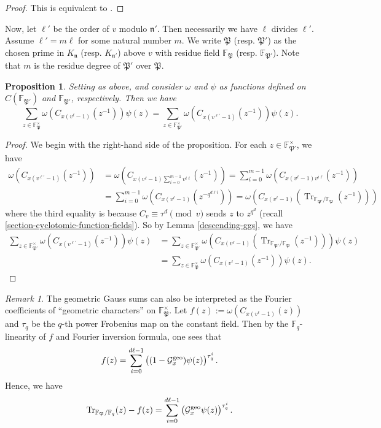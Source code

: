 \documentclass[11pt]{amsart}
\theoremstyle{plain}
\newtheorem{prop}[thm]{Proposition}
\theoremstyle{definition}
\theoremstyle{remark}
\newtheorem{rem}[thm]{Remark}
\numberwithin{equation}{section}
\newcommand{\FF}{\mathbb{F}}
\newcommand{\nfk}{\mathfrak{n}}
\newcommand{\Pfk}{\mathfrak{P}}
\newcommand{\Gcal}{\mathcal{G}}
\newcommand{\Tr}{\operatorname{Tr}}
\newcommand{\Fq}{\FF_q}
\newcommand{\bggs}{\Gcal^{\textnormal{geo}}}
\let\l\ell
\begin{document}
	\begin{proof}
		This is equivalent to \cite[Lemma I]{thakur1988gauss}.
	\end{proof}
	
	Now, let $\l'$ be the order of $v$ modulo $\nfk'$.
	Then necessarily we have $\l$ divides $\l'$.
	Assume $\l' = m\l$ for some natural number $m$.
	We write $\Pfk$ (resp. $\Pfk'$) as the chosen prime in $K_{\nfk}$ (resp. $K_{\nfk'}$) above $v$ with residue field $\FF_{\Pfk}$ (resp. $\FF_{\Pfk'}$).
	Note that $m$ is the residue degree of $\Pfk'$ over $\Pfk$.
	
	\begin{prop}    \label{compatibility-of-ggs}
		Setting as above, and consider $\omega$ and $\psi$ as functions defined on $C(\FF_{\Pfk'})$ and $\FF_{\Pfk'}$, respectively.
		Then we have
		$$
		\sum_{z \in \FF_{\Pfk}^\times} \omega\left(C_{x(v^\l-1)}(z^{-1})\right)\psi(z)
		= \sum_{z \in \FF_{\Pfk'}^\times} \omega\left(C_{x(v^{\l'}-1)}(z^{-1})\right)\psi(z).
		$$
	\end{prop}
	
	\begin{proof}
		We begin with the right-hand side of the proposition.
		For each $z \in \FF_{\Pfk'}^\times$, we have
		\begin{align*}
			\omega\left(C_{x(v^{\l'}-1)}(z^{-1})\right)
			&= \omega\left(C_{x(v^\l-1) \sum_{i=0}^{m-1} v^{i\l}}(z^{-1})\right)
			= \sum_{i=0}^{m-1} \omega\left(C_{x(v^\l-1)v^{i\l}}(z^{-1})\right)
			\\
			&= \sum_{i=0}^{m-1} \omega\left(C_{x(v^\l-1)}(z^{-q^{d\l i}})\right)
			= \omega\left(C_{x(v^\l-1)} (\Tr_{\FF_{\Pfk'}/\FF_{\Pfk}}(z^{-1}))\right)
		\end{align*}
		where the third equality is because $C_v \equiv \tau^d \pmod{v}$ sends $z$ to $z^{q^d}$ (recall \ref{section-cyclotomic-function-fields}).
		So by Lemma \ref{descending-ggs}, we have
		\begin{align*}
			\sum_{z \in \FF_{\Pfk'}^\times} \omega\left(C_{x(v^{\l'}-1)}(z^{-1})\right)\psi(z)
			&= \sum_{z \in \FF_{\Pfk'}^\times} \omega\left(C_{x(v^\l-1)}(\Tr_{\FF_{\Pfk'}/\FF_{\Pfk}}(z^{-1}))\right)\psi(z)        \\
			&= \sum_{z \in \FF_{\Pfk}^\times} \omega\left(C_{x(v^\l-1)}(z^{-1})\right)\psi(z).
		\end{align*}
	\end{proof} 
	
	\begin{rem}     \label{fourier-coefficients}
		The geometric Gauss sums can also be interpreted as the Fourier coefficients of “geometric characters” on $\FF_{\Pfk}^\times$.
		Let $f(z) := \omega(C_{x(v^\l-1)}(z))$ and $\tau_q$ be the $q$-th power Frobenius map on the constant field.
		Then by the $\Fq$-linearity of $f$ and Fourier inversion formula, one sees that
		$$
		f(z) = \sum_{i=0}^{d\l-1} \left( (1 - \bggs_x) \psi(z) \right)^{\tau_q^i}.
		$$
		Hence, we have
		$$
		\Tr_{\FF_\Pfk/\Fq}(z) - f(z)
		= \sum_{i=0}^{d\l-1} \left( \bggs_x \psi(z) \right)^{\tau_q^i}.
		$$
	\end{rem}
	
\end{document}
